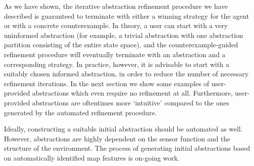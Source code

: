 As we have shown, the iterative abstraction refinement procedure we have described is guaranteed to terminate with either a winning strategy for the agent or with a concrete counterexample. In theory, a user can start with a very uninformed abstraction (for example, a trivial abstraction with one abstraction partition consisting of the entire state space), and the counterexample-guided refinement procedure will eventually terminate with an abstraction and a corresponding strategy. In practice, however, it is advisable to start with a suitably chosen informed abstraction, in order to reduce the number of necessary refinement iterations. In the next section we show some examples of user-provided abstractions which even require no refinement at all. Furthermore, user-provided abstractions are oftentimes 
more `intuitive' compared to the ones generated by the automated refinement procedure.

Ideally, constructing a suitable initial abstraction should be automated as well. However, abstractions are highly dependent on the sensor function and the structure of the environment. The process of generating initial abstractions based on automatically identified map features is on-going work. 